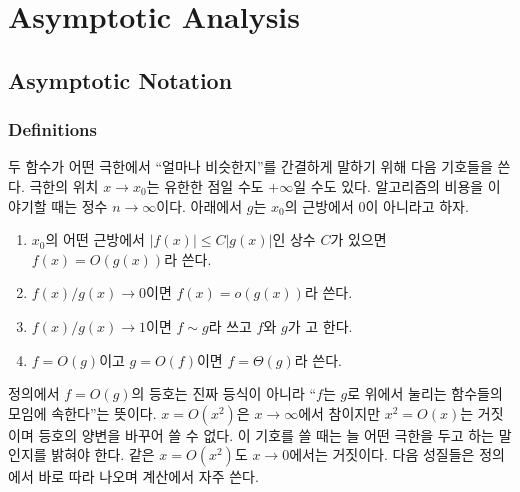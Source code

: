 \chapter{Asymptotic Analysis}
\label{ch:asymptotics}



\section{Asymptotic Notation}
\label{sec:asym-notation}

\subsection{Definitions}

두 함수가 어떤 극한에서 ``얼마나 비슷한지''를 간결하게 말하기 위해 다음 기호들을 쓴다. 극한의 위치 $x\to x_0$는 유한한 점일 수도 $+\infty$일 수도 있다. 알고리즘의 비용을 이야기할 때는 정수 $n\to\infty$이다. 아래에서 $g$는 $x_0$의 근방에서 $0$이 아니라고 하자.

\begin{definition}[점근 기호]
\label{def:big-o}
\begin{enumerate}
\item $x_0$의 어떤 근방에서 $|f(x)|\le C|g(x)|$인 상수 $C$가 있으면 $f(x)=O(g(x))$라 쓴다.
\item $f(x)/g(x)\to0$이면 $f(x)=o(g(x))$라 쓴다.
\item $f(x)/g(x)\to1$이면 $f\sim g$라 쓰고 $f$와 $g$가 고 한다.
\item $f=O(g)$이고 $g=O(f)$이면 $f=\Theta(g)$라 쓴다.
\end{enumerate}
\end{definition}

정의에서 $f=O(g)$의 등호는 진짜 등식이 아니라 ``$f$는 $g$로 위에서 눌리는 함수들의 모임에 속한다''는 뜻이다. $x=O(x^2)$은 $x\to\infty$에서 참이지만 $x^2=O(x)$는 거짓이며 등호의 양변을 바꾸어 쓸 수 없다. 이 기호를 쓸 때는 늘 어떤 극한을 두고 하는 말인지를 밝혀야 한다. 같은 $x=O(x^2)$도 $x\to0$에서는 거짓이다. 다음 성질들은 정의에서 바로 따라 나오며 계산에서 자주 쓴다.

